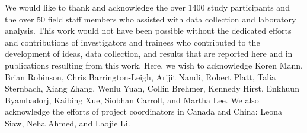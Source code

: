 \documentclass[
  letterpaper,
  DIV=11,
  numbers=noendperiod]{scrartcl}
\providecommand{\DIFadd}[1]{{\protect\color{blue}\uwave{#1}}} %
\providecommand{\DIFaddbegin}{} %
\providecommand{\DIFaddend}{} %
\providecommand{\DIFdelbegin}{} %
\providecommand{\DIFdelend}{} %
\newcommand{\DIFscaledelfig}{0.5}
\newlength{\DIFdelgraphicswidth} %
\newlength{\DIFdelgraphicsheight} %
\newcommand{\DIFaddincludegraphics}[2][]{{\color{blue}\fbox{\DIFOincludegraphics[#1]{#2}}}} %
\newcommand{\DIFdelincludegraphics}[2][]{%
\sbox{\DIFdelgraphicsbox}{\DIFOincludegraphics[#1]{#2}}%
\settoboxwidth{\DIFdelgraphicswidth}{\DIFdelgraphicsbox} %
\settoboxtotalheight{\DIFdelgraphicsheight}{\DIFdelgraphicsbox} %
\scalebox{\DIFscaledelfig}{%
\parbox[b]{\DIFdelgraphicswidth}{\usebox{\DIFdelgraphicsbox}\\[-\baselineskip] \rule{\DIFdelgraphicswidth}{0em}}\llap{\resizebox{\DIFdelgraphicswidth}{\DIFdelgraphicsheight}{%
\setlength{\unitlength}{\DIFdelgraphicswidth}%
\begin{picture}(1,1)%
\thicklines\linethickness{2pt} %
{\color[rgb]{1,0,0}\put(0,0){\framebox(1,1){}}}%
{\color[rgb]{1,0,0}\put(0,0){\line( 1,1){1}}}%
{\color[rgb]{1,0,0}\put(0,1){\line(1,-1){1}}}%
\end{picture}%
}\hspace*{3pt}}} %
} %
\DeclareRobustCommand{\DIFaddbegin}{\DIFOaddbegin \let\includegraphics\DIFaddincludegraphics} %
\DeclareRobustCommand{\DIFaddend}{\DIFOaddend \let\includegraphics\DIFOincludegraphics} %
\DeclareRobustCommand{\DIFdelbegin}{\DIFOdelbegin \let\includegraphics\DIFdelincludegraphics} %
\DeclareRobustCommand{\DIFdelend}{\DIFOaddend \let\includegraphics\DIFOincludegraphics} %
\begin{document}
We would like to thank and acknowledge the over 1400 study participants
and the over 50 field staff members who assisted with data collection
and laboratory analysis. This work would not have been possible without
the dedicated efforts and contributions of investigators and trainees
who contributed to the development of ideas, data collection, and
results that are reported here and in publications resulting from this
work. Here, we wish to acknowledge Koren Mann, Brian Robinson, Chris
Barrington-Leigh, Arijit Nandi, Robert Platt, Talia Sternbach, Xiang
Zhang, Wenlu Yuan, Collin Brehmer, Kennedy Hirst, Enkhuun Byambadorj,
Kaibing Xue, Siobhan Carroll, and Martha Lee. We also acknowledge the
efforts of project coordinators in Canada and China: Leona Siaw, Neha
Ahmed, and Laojie Li.

\DIFdelbegin %
\DIFdelend \DIFaddbegin \section{\DIFadd{References}}\label{references}
\DIFaddend 
\end{document}
